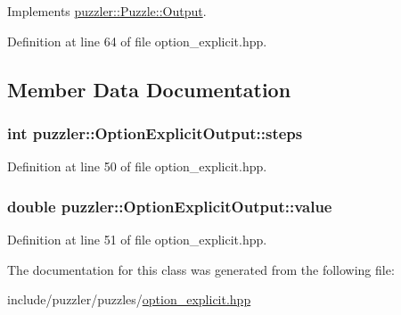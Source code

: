 Implements \hyperlink{a00023_a6f38b053870861fd4afe8819174c4d3d}{puzzler\+::\+Puzzle\+::\+Output}.



Definition at line 64 of file option\+\_\+explicit.\+hpp.



\subsection{Member Data Documentation}
\hypertarget{a00020_a4537f91041cd43bd1efebd7c21a83ca9}{}
\subsubsection[{steps}]{\setlength{\rightskip}{0pt plus 5cm}int puzzler\+::\+Option\+Explicit\+Output\+::steps}\label{a00020_a4537f91041cd43bd1efebd7c21a83ca9}


Definition at line 50 of file option\+\_\+explicit.\+hpp.

\hypertarget{a00020_a37bc5d5542984f932dc2a5f114d02f1b}{}
\subsubsection[{value}]{\setlength{\rightskip}{0pt plus 5cm}double puzzler\+::\+Option\+Explicit\+Output\+::value}\label{a00020_a37bc5d5542984f932dc2a5f114d02f1b}


Definition at line 51 of file option\+\_\+explicit.\+hpp.



The documentation for this class was generated from the following file\+:\begin{DoxyCompactItemize}
\item 
include/puzzler/puzzles/\hyperlink{a00132}{option\+\_\+explicit.\+hpp}\end{DoxyCompactItemize}
